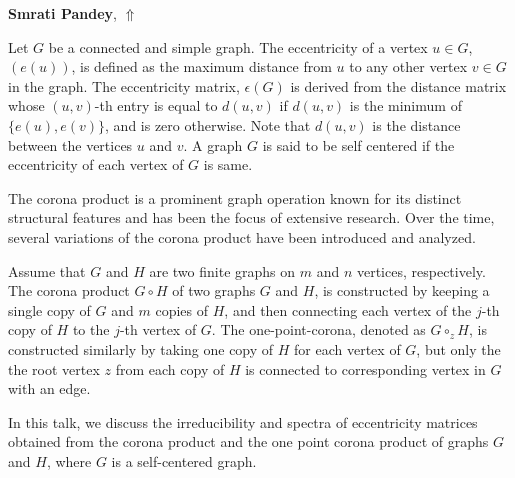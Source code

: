\documentclass[ILAS2025-program.tex]{subfiles}
\begin{document}
\hypertarget{down0424}{}\begin{ilasabstract}
    
\textbf{Smrati Pandey},  \hfill \hyperlink{up0424}{$\Uparrow$}
    
    
\mtskip
    Let $G$ be a connected and simple graph. The eccentricity of a vertex $u \in G$, $(e(u))$, is defined as the maximum distance from $u$ to any other vertex $v \in G$ in the graph. The eccentricity matrix, $\epsilon(G)$ is derived from the distance matrix whose $(u, v)$-th entry is equal to $d(u, v)$ if $d(u, v)$ is the minimum of $\{e(u), e(v)\}$, and is zero otherwise. Note that $d(u, v)$ is the distance between the vertices $u$ and $v$. A graph $G$ is said to be self centered if the eccentricity of each vertex of $G$ is same. 

The corona product is a prominent graph operation known for its distinct structural features and has been the focus of extensive research. Over the time, several variations of the corona product have been introduced and analyzed.

Assume that $G$ and $H$ are two finite graphs on $m$ and $n$ vertices, respectively. The corona product $G \circ H$ of two graphs $G$ and $H$, is constructed by keeping a single copy of $G$ and $m$ copies of $H$, and then connecting each vertex of the $j$-th copy of $H$ to the $j$-th vertex of $G$. The one-point-corona, denoted as $G \circ_z H$, is constructed similarly by taking one copy of $H$ for each vertex of $G$, but only the the root vertex $z$ from each copy of $H$ is connected to corresponding vertex in $G$ with an edge.

In this talk, we discuss the irreducibility and spectra of eccentricity matrices obtained from the  corona product and the one point corona product of graphs $G$ and $H$, where $G$ is a self-centered graph.
\end{ilasabstract}
    
\end{document}
